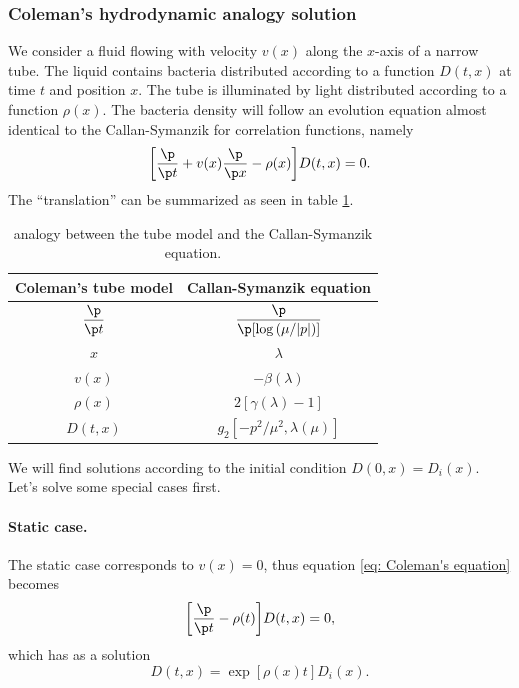 \subsubsection{Coleman's hydrodynamic analogy solution}
We consider a fluid flowing with velocity $v(x)$ along the $x$-axis of a narrow tube. The liquid contains bacteria distributed according to a function $D(t,x)$ at time $t$ and position $x$. The tube is illuminated by light distributed according to a function $\rho(x)$. The bacteria density will follow an evolution equation almost identical to the Callan-Symanzik for correlation functions, namely
\begin{equation}
\label{eq: Coleman's equation}
    \bigg[\frac{\p}{\p t} + v(x)\frac{\p}{\p x} - \rho(x)\bigg]D(t,x) = 0.
\end{equation}
The ``translation'' can be summarized as seen in table \ref{tab: Coleman's tube model-CS equation analogy}.
\begin{table}[h]
    \centering
    \renewcommand{\arraystretch}{1.2}
    \begin{tabular}{|c|c|}
        \hline
        Coleman's tube model & Callan-Symanzik equation \\ \hline \rule{0pt}{4ex}
        $\dfrac{\p}{\p t}$ & $\dfrac{\p}{\p[\log{(\mu/|p|)}]}$ \\
        $x$ & $\lambda$ \\
         $v(x)$ & $-\beta(\lambda)$ \\
         $\rho(x)$ & $2[\gamma(\lambda) - 1]$ \\
         $D(t,x)$ & $g_2[-p^2/\mu^2,\lambda(\mu)]$ \\ \hline
    \end{tabular}
    \caption{analogy between the tube model and the Callan-Symanzik equation.}
    \label{tab: Coleman's tube model-CS equation analogy}
\end{table}

We will find solutions according to the initial condition $D(0,x) = D_i(x)$. Let's solve some special cases first. 
\paragraph{Static case.} The static case corresponds to $v(x) = 0$, thus equation \eqref{eq: Coleman's equation} becomes
\begin{equation}
    \bigg[\frac{\p}{\p t} - \rho(t)\bigg]D(t,x) = 0,
\end{equation}
which has as a solution 
\begin{equation}
    D(t,x) = \exp{[\rho(x)t]}D_i(x).
\end{equation}

